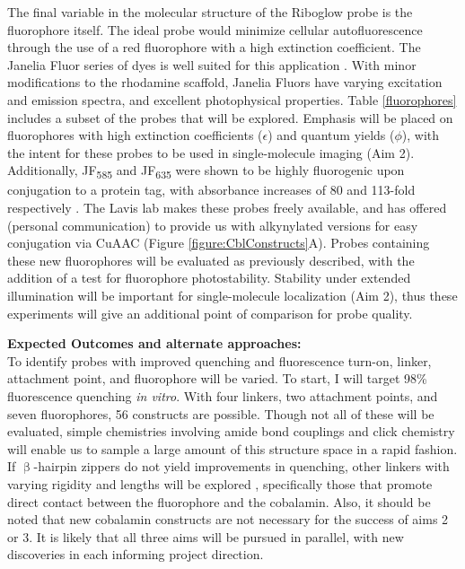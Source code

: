 The final variable in the molecular structure of the Riboglow probe is the fluorophore itself. The ideal probe would minimize cellular autofluorescence through the use of a red fluorophore with a high extinction coefficient. The Janelia Fluor series of dyes is well suited for this application \cite{Grimmgeneralmethodfinetune2017,Grimmgeneralmethodimprove2015}. With minor modifications to the rhodamine scaffold, Janelia Fluors have varying excitation and emission spectra, and excellent photophysical properties.
Table \ref{fluorophores} includes a subset of the probes that will be explored.
Emphasis will be placed on fluorophores with high extinction coefficients ($\epsilon$) and quantum yields ($\phi$), with the intent for these probes to be used in single-molecule imaging (Aim 2).
Additionally, JF\textsubscript{585} and JF\textsubscript{635} were shown to be highly fluorogenic upon conjugation to a protein tag, with absorbance increases of 80 and 113-fold respectively \cite{Grimmgeneralmethodfinetune2017}.
The Lavis lab makes these probes freely available, and has offered (personal communication) to provide us with alkynylated versions for easy conjugation via CuAAC (Figure \ref{figure:CblConstructs}A).
Probes containing these new fluorophores will be evaluated as previously described, with the addition of a test for fluorophore photostability.
Stability under extended illumination will be important for single-molecule localization (Aim 2), thus these experiments will give an additional point of comparison for probe quality.

\textbf{Expected Outcomes and alternate approaches:}\\
To identify probes with improved quenching and fluorescence turn-on, linker, attachment point, and fluorophore will be varied. To start, I will target 98\% fluorescence quenching \textit{in vitro}. With four linkers, two attachment points, and seven fluorophores, 56 constructs are possible. Though not all of these will be evaluated, simple chemistries involving amide bond couplings and click chemistry will enable us to sample a large amount of this structure space in a rapid fashion. If $\upbeta$-hairpin zippers do not yield improvements in quenching, other linkers with varying rigidity and lengths will be explored \cite{LeeDesignSynthesisCharacterization2009}, specifically those that promote direct contact between the fluorophore and the cobalamin. Also, it should be noted that new cobalamin constructs are not necessary for the success of aims 2 or 3. It is likely that all three aims will be pursued in parallel, with new discoveries in each informing project direction.

